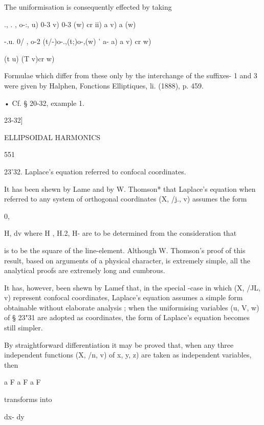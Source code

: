 {{{The uniformisation is consequently effected by taking

., . , o-:, u) 0-3 v) 0-3 (w) cr ii) a v) a (w)

-.u. 0/ , o-2 (t/-)o-.,(t;)o-,(w) ' a- a) a v) cr w)

(t u) (T v)cr w)

Formulae which differ from these only by the interchange of the
suffixes- 1 and 3 were given by Halphen, Fonctions Elliptiques, li.
(1888), p. 459.

• Cf. § 20-32, example 1.



23-32]



ELLIPSOIDAL HARMONICS



551



23'32. Laplace's equation referred to confocal coordinates.

It has been shewn by Lame and by W. Thomson* that Laplace's equation
when referred to any system of orthogonal coordinates (X, /j., v)
assumes the form






0,



H, dv where H , H.2, H- are to be determined from the consideration
that

is to be the square of the line-element. Although W. Thomson's proof
of this result, based on arguments of a physical character, is
extremely simple, all the analytical proofs are extremely long and
cumbrous.

It has, however, been shewn by Lamef that, in the special -case in
which (X, /JL, v) represent confocal coordinates, Laplace's equation
assumes a simple form obtainable without elaborate analysis ; when the
uniformising variables (u, V, w) of § 23"31 are adopted as
coordinates, the form of Laplace's equation becomes still simpler.

By straightforward differentiation it may be proved that, when any
three independent functions (X, /n, v) of x, y, z) are taken as
independent variables, then

a F a F a F



transforms into



dx- dy



}}}
